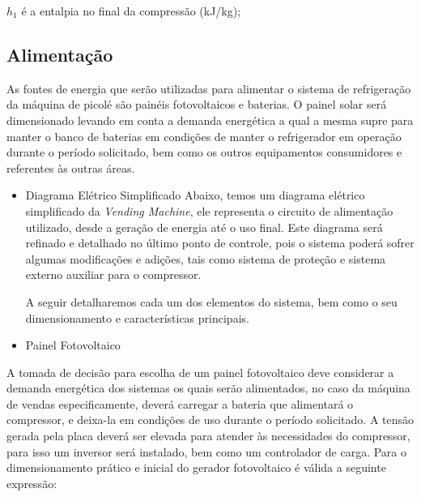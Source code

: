 $h_{1}$ é a entalpia no final da compressão (kJ/kg);


\subsection{Alimentação}
	As fontes de energia que serão utilizadas para alimentar o sistema de refrigeração da máquina de picolé são painéis fotovoltaicos e baterias. O painel solar será dimensionado levando em conta a demanda energética a qual a mesma supre para manter o banco de baterias em condições de manter o refrigerador em operação durante o período solicitado, bem como os outros equipamentos consumidores e referentes às outras áreas.

  \begin{itemize}
    \item Diagrama Elétrico Simplificado
    	Abaixo, temos um diagrama elétrico simplificado da \textit{Vending Machine}, ele representa o circuito de alimentação utilizado, desde a geração de energia até o uso final. Este diagrama será refinado e detalhado no último ponto de controle, pois o sistema poderá sofrer algumas modificações e adições, tais como sistema de proteção e sistema externo auxiliar para o compressor.


		A seguir detalharemos cada um dos elementos do sistema, bem como o seu dimensionamento e características principais.

\end{itemize}


\begin{itemize}
\item Painel Fotovoltaico
\end{itemize}
		A tomada de decisão para escolha de um painel fotovoltaico deve considerar a demanda energética dos sistemas os quais serão alimentados, no caso da máquina de vendas especificamente, deverá carregar a bateria que alimentará o compressor, e deixa-la em condições de uso durante o período solicitado. A tensão gerada pela placa deverá ser elevada para atender às necessidades do compressor, para isso um inversor será instalado, bem como um controlador de carga.
        Para o dimensionamento prático e inicial do gerador fotovoltaico é válida a seguinte expressão:

